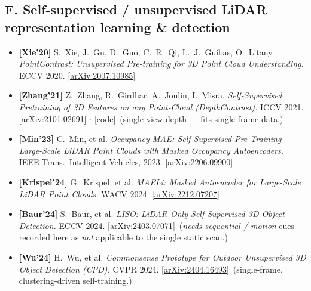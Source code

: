 \documentclass[10pt,a4paper]{article}
\begin{document}
{\subsection*{F. Self-supervised / unsupervised LiDAR representation learning \& detection}
\begin{itemize}[leftmargin=1.4em,itemsep=3pt,topsep=2pt]
  \item \textbf{[Xie'20]} S.~Xie, J.~Gu, D.~Guo, C.~R.~Qi, L.~J.~Guibas, O.~Litany.
  \emph{PointContrast: Unsupervised Pre-training for 3D Point Cloud Understanding.} ECCV
  2020. \href{https://arxiv.org/abs/2007.10985}{[arXiv:2007.10985]}
  \item \textbf{[Zhang'21]} Z.~Zhang, R.~Girdhar, A.~Joulin, I.~Misra. \emph{Self-Supervised
  Pretraining of 3D Features on any Point-Cloud (DepthContrast).} ICCV 2021.
  \href{https://arxiv.org/abs/2101.02691}{[arXiv:2101.02691]}
  $\cdot$ \href{https://github.com/facebookresearch/DepthContrast}{[code]} \,(single-view
  depth --- fits single-frame data.)
  \item \textbf{[Min'23]} C.~Min, et al. \emph{Occupancy-MAE: Self-Supervised Pre-Training
  Large-Scale LiDAR Point Clouds with Masked Occupancy Autoencoders.} IEEE Trans.\
  Intelligent Vehicles, 2023. \href{https://arxiv.org/abs/2206.09900}{[arXiv:2206.09900]}
  \item \textbf{[Krispel'24]} G.~Krispel, et al. \emph{MAELi: Masked Autoencoder for
  Large-Scale LiDAR Point Clouds.} WACV 2024.
  \href{https://arxiv.org/abs/2212.07207}{[arXiv:2212.07207]}
  \item \textbf{[Baur'24]} S.~Baur, et al. \emph{LISO: LiDAR-Only Self-Supervised 3D Object
  Detection.} ECCV 2024. \href{https://arxiv.org/abs/2403.07071}{[arXiv:2403.07071]}
  \,(\emph{needs sequential / motion} cues --- recorded here as \emph{not} applicable to the
  single static scan.)
  \item \textbf{[Wu'24]} H.~Wu, et al. \emph{Commonsense Prototype for Outdoor Unsupervised
  3D Object Detection (CPD).} CVPR 2024. \href{https://arxiv.org/abs/2404.16493}{[arXiv:2404.16493]}
  \,(single-frame, clustering-driven self-training.)
\end{itemize}

}
\end{document}
